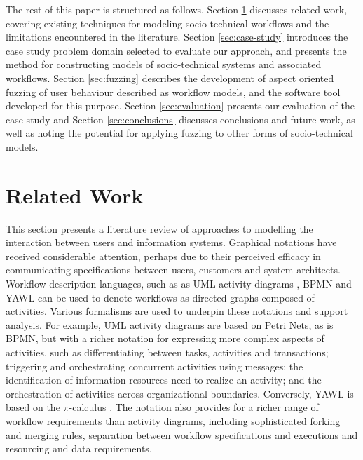\documentclass{llncs}
\newcommand{\picalc}{\(\pi\)-calculus }
\begin{document}
The rest of this paper is structured as follows.  Section \ref{sec:related} discusses related work, covering existing
techniques for modeling socio-technical workflows and the limitations encountered in the literature.  Section
\ref{sec:case-study} introduces the case study problem domain selected to evaluate our approach, and presents the method
for constructing models of socio-technical systems and associated workflows. Section \ref{sec:fuzzing} describes the
development of aspect oriented fuzzing of user behaviour described as workflow models, and the software tool developed for
this purpose.  Section \ref{sec:evaluation} presents our evaluation of the case study and Section \ref{sec:conclusions} discusses conclusions and future work,
as well as noting the potential for applying fuzzing to other forms of socio-technical models.


\section{Related Work}
\label{sec:related}


This section presents a literature review of approaches to modelling the interaction between users and information
systems.  Graphical notations have received considerable attention, perhaps due to their perceived efficacy in
communicating specifications between users, customers and system architects.  Workflow description languages, such as as
UML activity diagrams \citep{omg07omguml}, BPMN \citep{omg2011omgbpmn} and YAWL \citep{hofstede2010yawl} can be used to
denote workflows as directed graphs composed of activities.  Various formalisms are used to underpin these notations and
support analysis.  For example, UML activity diagrams are based on Petri Nets, as is BPMN, but with a richer notation
for expressing more complex aspects of activities, such as differentiating between tasks, activities and transactions;
triggering and orchestrating concurrent activities using messages; the identification of information resources need to
realize an activity; and the orchestration of activities across organizational boundaries.  Conversely, YAWL is based on
the \picalc \citep{aalst2004workflow}.  The notation also provides for a richer range of workflow requirements than
activity diagrams, including sophisticated forking and merging rules, separation between workflow specifications and
executions and resourcing and data requirements.
\end{document}
